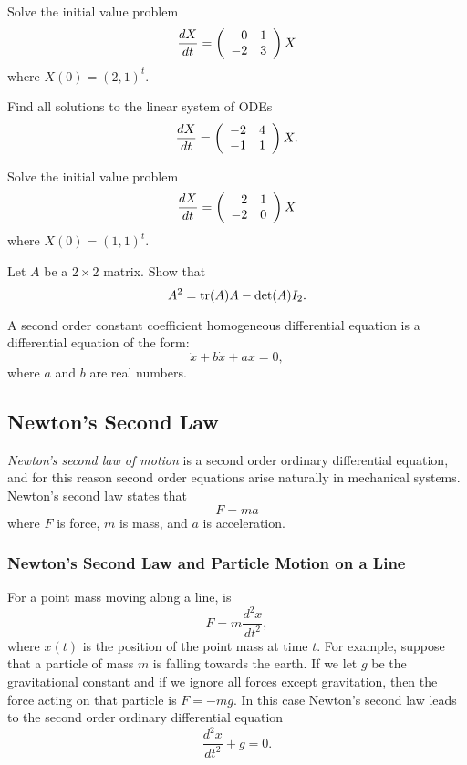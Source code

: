 \begin{exercise} \label{c6.6.2}
Solve the initial value problem
\[
\frac{dX}{dt} = \left(\begin{array}{rr} 0 & 1\\ -2 &3\end{array}\right) X
\]
where $X(0)=(2,1)^t$.
\end{exercise}

\begin{exercise} \label{c6.6.3}
Find all solutions to the linear system of ODEs
\[
\frac{dX}{dt} = \left(\begin{array}{rr} -2 & 4\\ -1 &1\end{array}\right) X.
\]
\end{exercise}

\begin{exercise} \label{c6.6.4}
Solve the initial value problem
\[
\frac{dX}{dt} =  \left(\begin{array}{rr} 2 & 1\\ -2 &0\end{array}\right)X
\]
where $X(0)=(1,1)^t$.
\end{exercise}

\begin{exercise}  \label{c6.CH}
Let $A$ be a $2\times 2$ matrix.  Show that
\[
A^2 = {\rm tr}(A)A-\det(A)I_2.
\]
\end{exercise}



  \label{S:SOE}

A second order constant coefficient
homogeneous differential equation
is a differential equation of the form:
\begin{equation} \label{eq:soex1}
\ddot{x} + b\dot{x} + ax = 0,
\end{equation}
where $a$ and $b$ are real numbers.

\subsection*{Newton's Second Law}

{\em Newton's second law of motion\/} is a second order ordinary
differential equation, and for this reason second order equations arise
naturally in mechanical systems.  Newton's second law states that
\begin{equation}  \label{e:2ndlaw}
F=ma
\end{equation}
where $F$ is force, $m$ is mass,
and $a$ is acceleration.

\subsubsection*{Newton's Second Law and Particle Motion on a Line}

For a point mass moving along a line,  is
\begin{equation} \label{E:F=ma}
F=m\frac{d^2x}{dt^2},
\end{equation}
where $x(t)$ is the position of the point mass at time $t$.
For example, suppose that a particle of mass $m$ is falling towards
the earth.  If we let $g$ be the gravitational constant and if we
ignore all forces except gravitation, then the force acting on that
particle is $F=-mg$.  In this case Newton's second law leads to the
second order ordinary differential equation
\begin{equation} \label{e:pointpart}
\frac{d^2x}{dt^2}+g=0.
\end{equation}

